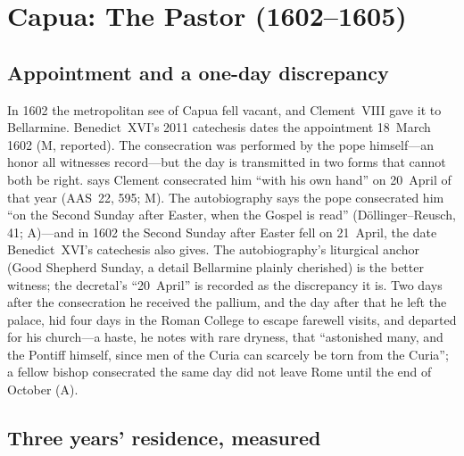 \section{Capua: The Pastor (1602--1605)}

\subsection{Appointment and a one-day discrepancy}

In 1602 the metropolitan see of Capua fell vacant, and Clement~VIII
gave it to Bellarmine. Benedict~XVI's 2011 catechesis dates the
appointment 18~March 1602 (M, reported). The consecration was
performed by the pope himself---an honor all witnesses record---but
the day is transmitted in two forms that cannot both be right.
 says Clement consecrated him ``with his own hand''
on 20~April of that year (AAS~22, 595; M). The autobiography says
the pope consecrated him ``on the Second Sunday after Easter, when
the Gospel  is read''
(D\"ollinger--Reusch, 41; A)---and in 1602 the Second Sunday after
Easter fell on 21~April, the date Benedict~XVI's catechesis also
gives. The autobiography's liturgical anchor (Good Shepherd Sunday,
a detail Bellarmine plainly cherished) is the better witness; the
decretal's ``20~April'' is recorded as the discrepancy it is. Two
days after the consecration he received the pallium, and the day
after that he left the palace, hid four days in the Roman College
to escape farewell visits, and departed for his church---a haste,
he notes with rare dryness, that ``astonished many, and the
Pontiff himself, since men of the Curia can scarcely be torn from
the Curia''; a fellow bishop consecrated the same day did not
leave Rome until the end of October (A).

\subsection{Three years' residence, measured}

